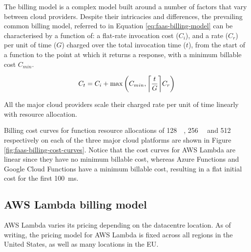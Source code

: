 The \faas{} billing model is a complex model built around a number of factors that vary between cloud providers. Despite their intricacies and differences, the prevailing common billing model, referred to in Equation \ref{eq:faas-billing-model} can be characterised by a function of: a flat-rate invocation cost ($C_i$), and a rate ($C_r$) per unit of time ($G$) charged over the total invocation time ($t$), from the start of a function to the point at which it returns a response, with a minimum billable cost $C_{min}$.

\begin{equation} \label{eq:faas-billing-model}
C_t = C_i + \max\left(C_{min},\ceil*{\frac{t}{G}} C_r\right)
\end{equation}

All the major cloud providers scale their charged rate per unit of time linearly with resource allocation.

Billing cost curves for function resource allocations of \SI{128}{\mega\byte}, \SI{256}{\mega\byte} and \SI{512}{\mega\byte} respectively on each of the three major cloud platforms are shown in Figure \ref{fig:faas-billing-cost-curves}. Notice that the cost curves for AWS Lambda are linear since they have no minimum billable cost, whereas Azure Functions and Google Cloud Functions have a minimum billable cost, resulting in a flat initial cost for the first \SI{100}{\milli\second}.

\begin{figure*}[htp]
    \centering
    \quad
    \quad
    \caption{\faas{} billing cost curves by cloud provider}
    \label{fig:faas-billing-cost-curves}
\end{figure*}

\subsection{AWS Lambda billing model}
AWS Lambda varies its pricing depending on the datacentre location. As of writing, the pricing model for AWS Lambda is fixed across all regions in the United States, as well as many locations in the EU\cite{ServerlessComputingAWS}.

